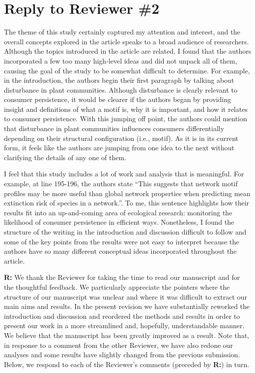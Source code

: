 \documentclass[12pt]{article}
\newenvironment{refquote}{\bigskip \begin{it}}{\end{it}\medskip}
\begin{document}
\clearpage

\section*{Reply to Reviewer \#2}

    \begin{refquote}

        The theme of this study certainly captured my attention and interest, and the overall concepts explored in the article speaks to a broad audience of researchers. Although the topics introduced in the article are related, I found that the authors incorporated a few too many high-level ideas
        and did not unpack all of them, causing the goal of the study to be somewhat difficult to determine. For example, in the introduction, the authors begin their first paragraph by talking about disturbance in plant communities. Although disturbance is clearly relevant to consumer persistence, it would be clearer if the authors began by providing insight and definitions of what a motif is, why it is important, and how it relates to consumer persistence. With this jumping off point, the authors could mention that disturbance in plant communities influences consumers differentially depending on their structural configuration (i.e., motif). As it is in its current form, it feels like the authors are jumping from one idea to the next without clarifying the details of any one of them.

        I feel that this study includes a lot of work and analysis that is meaningful. For example, at line 195-196, the authors state ``This suggests that network motif profiles may be more useful than global network properties when predicting mean extinction risk of species in a network.''. To me, this sentence highlights how their results fit into an up-and-coming area of ecological research: monitoring the likelihood of consumer persistence in efficient ways. Nonetheless, I found the structure of the writing in the introduction and discussion difficult to follow and some of the key points from the results were not easy to interpret because the authors have so many different conceptual ideas incorporated throughout the article.

    \end{refquote}


    \textbf{R:} We thank the Reviewer for taking the time to read our manuscript and for the thoughtful feedback. We particularly appreciate the pointers where the structure of our manuscript was unclear and where it was difficult to extract our main aims and results. In the present revision we have substantially reworked the introduction and discussion and reordered the methods and results in order to present our work in a more streamlined and, hopefully, understandable manner. We believe that the manuscript has been greatly improved as a result. Note that, in response to a comment from the other Reviewer, we have also redone our analyses and some results have slightly changed from the previous submission. Below, we respond to each of the Reviewer's comments (preceded by \textbf{R:}) in turn.
\end{document}
